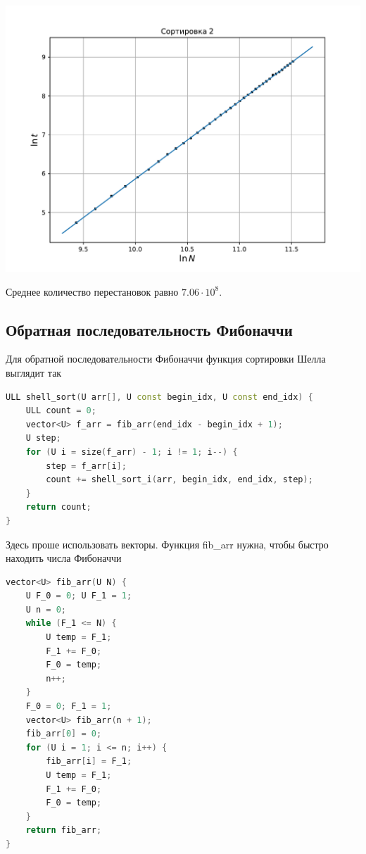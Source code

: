 \documentclass[a4paper,12pt]{article}
\begin{document}
\begin{center}
\includegraphics[scale=0.6]{Figure_3.pdf}
\end{center}

Среднее количество перестановок равно $7.06 \cdot 10^8$.

\subsection*{Обратная последовательность Фибоначчи}
Для обратной последовательности Фибоначчи функция сортировки Шелла выглядит так

\begin{lstlisting}[language=C++]
ULL shell_sort(U arr[], U const begin_idx, U const end_idx) {
    ULL count = 0;
    vector<U> f_arr = fib_arr(end_idx - begin_idx + 1);
    U step;
    for (U i = size(f_arr) - 1; i != 1; i--) {
        step = f_arr[i];
        count += shell_sort_i(arr, begin_idx, end_idx, step);
    }
    return count;
}
\end{lstlisting}

Здесь проше использовать векторы. Функция fib\_arr нужна, чтобы быстро находить числа Фибоначчи

\begin{lstlisting}[language=C++]
vector<U> fib_arr(U N) {
    U F_0 = 0; U F_1 = 1;
    U n = 0;
    while (F_1 <= N) {
        U temp = F_1;
        F_1 += F_0;
        F_0 = temp;
        n++;
    }
    F_0 = 0; F_1 = 1;
    vector<U> fib_arr(n + 1);
    fib_arr[0] = 0;
    for (U i = 1; i <= n; i++) {
        fib_arr[i] = F_1;
        U temp = F_1;
        F_1 += F_0;
        F_0 = temp;
    }
    return fib_arr;
}
\end{lstlisting}
\end{document}
